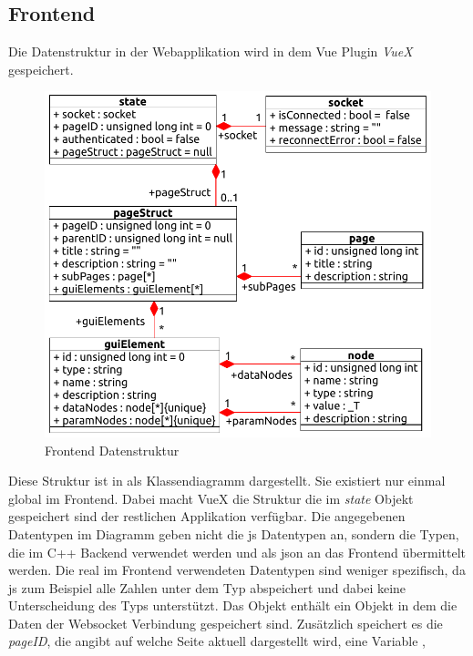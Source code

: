 \subsection{Frontend}\label{subsec:dataFrontend}
Die Datenstruktur in der Webapplikation wird in dem Vue Plugin \emph{VueX} gespeichert.

\begin{figure}[ht]
  \centering
  \includegraphics[width=\textwidth]{content/hauptteil/systemEntwurf/res/structureFrontend.pdf}
  \caption[Frontend Datenstruktur]{Frontend Datenstruktur}
  \label{fig:structFrontendState}
\end{figure} 
Diese Struktur ist in  als Klassendiagramm dargestellt. Sie existiert nur einmal global im Frontend.
Dabei macht VueX die Struktur die im \emph{state} Objekt gespeichert sind der restlichen Applikation verfügbar.
Die angegebenen Datentypen im Diagramm geben nicht die \acl{js} Datentypen an, sondern die Typen, 
die im C++ Backend verwendet werden und als \ac{json} an das Frontend übermittelt werden.
Die real im Frontend verwendeten Datentypen sind weniger spezifisch, 
da \acl{js} zum Beispiel alle Zahlen unter dem Typ  abspeichert und dabei keine Unterscheidung des Typs unterstützt.
Das  Objekt enthält ein  Objekt in dem die Daten der Websocket Verbindung gespeichert sind.
Zusätzlich speichert es die \emph{pageID}, die angibt auf welche Seite aktuell dargestellt wird, eine Variable , 
